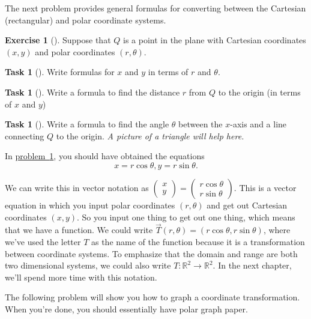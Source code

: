 \documentclass[10pt,]{book}
\theoremstyle{plain}
\theoremstyle{definition}
\theoremstyle{definition}
\theoremstyle{definition}
\theoremstyle{definition}
\newtheorem{exploration}[project]{Exercise}
\newtheorem{task}[project]{Task}
\theoremstyle{definition}
\numberwithin{equation}{section}
\begin{document}
The next problem provides general formulas for converting between the Cartesian (rectangular) and polar coordinate systems.%
\begin{exploration}[]\label{prob_polar_coordinate_equations}
Suppose that \(Q\) is a point in the plane with Cartesian coordinates \((x,y)\) and polar coordinates \((r,\theta)\).%
\begin{task}[]\label{task-140}
Write formulas for \(x\) and \(y\) in terms of \(r\) and \(\theta\).%
\end{task}
\begin{task}[]\label{task-141}
Write a formula to find the distance \(r\) from \(Q\) to the origin (in terms of \(x\) and \(y\))%
\end{task}
\begin{task}[]\label{task-142}
Write a formula to find the angle \(\theta\) between the \(x\)-axis and a line connecting \(Q\) to the origin. \emph{A picture of a triangle will help here.%
}%
\end{task}
\end{exploration}
In \hyperref[prob_polar_coordinate_equations]{problem~\ref{prob_polar_coordinate_equations}}, you should have obtained the equations%
\begin{equation*}
x=r\cos\theta,  y=r\sin\theta.
\end{equation*}
%
\par
We can write this in vector notation as \(\begin{pmatrix}x\\y
\end{pmatrix} =\begin{pmatrix}r\cos\theta\\ r\sin\theta
\end{pmatrix}\). This is a vector equation in which you input polar coordinates \((r,\theta)\) and get out Cartesian coordinates \((x,y)\). So you input one thing to get out one thing, which means that we have a function. We could write \(\vec T(r,\theta) = (r\cos\theta,r\sin\theta)\), where we've used the letter \(T\) as the name of the function because it is a transformation between coordinate systems. To emphasize that the domain and range are both two dimensional systems, we could also write \(T:\mathbb{R}^2\to\mathbb{R}^2\). In the next chapter, we'll spend more time with this notation.%
\par
The following problem will show you how to graph a coordinate transformation. When you're done, you should essentially have polar graph paper.%
\end{document}
